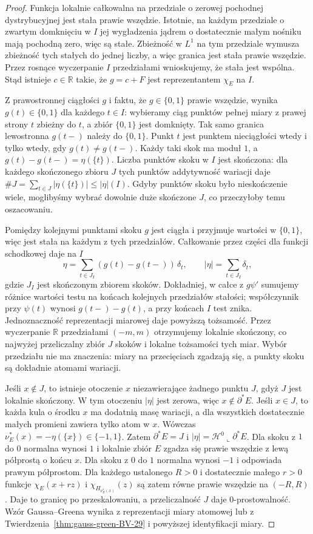 \begin{proof}
Funkcja lokalnie całkowalna na przedziale
o zerowej pochodnej dystrybucyjnej jest stała
prawie wszędzie. Istotnie, na każdym przedziale
o zwartym domknięciu w $I$ jej wygładzenia
jądrem o dostatecznie małym nośniku mają
pochodną zero, więc są stałe. Zbieżność
w $L^1$ na tym przedziale wymusza zbieżność
tych stałych do jednej liczby, a więc granica
jest stała prawie wszędzie. Przez rosnące
wyczerpanie $I$ przedziałami wnioskujemy,
że stała jest wspólna. Stąd istnieje $c\in\mathbb R$
takie, że $g=c+F$ jest reprezentantem $\chi_E$
na $I$.

Z prawostronnej ciągłości $g$ i faktu, że
$g\in\{0,1\}$ prawie wszędzie, wynika
$g(t)\in\{0,1\}$ dla każdego $t\in I$:
wybieramy ciąg punktów pełnej miary z prawej
strony $t$ zbieżny do $t$, a zbiór $\{0,1\}$
jest domknięty. Tak samo granica lewostronna
$g(t-)$ należy do $\{0,1\}$.
Punkt $t$ jest punktem nieciągłości wtedy
i tylko wtedy, gdy $g(t)\ne g(t-)$.
Każdy taki skok ma moduł $1$, a
$g(t)-g(t-)=\eta(\{t\})$.
Liczba punktów skoku w $I$ jest skończona:
dla każdego skończonego zbioru $J$ tych punktów
addytywność wariacji daje
$\#J=\sum_{t\in J}|\eta(\{t\})|\le|\eta|(I)$.
Gdyby punktów skoku było nieskończenie wiele,
moglibyśmy wybrać dowolnie duże skończone $J$,
co przeczyłoby temu oszacowaniu.

Pomiędzy kolejnymi punktami skoku $g$ jest
ciągła i przyjmuje wartości w $\{0,1\}$, więc
jest stała na każdym z tych przedziałów.
Całkowanie przez części dla funkcji schodkowej
daje na $I$
\[
 \eta=\sum_{t\in J_I}(g(t)-g(t-))\,\delta_t,
 \qquad |\eta|=\sum_{t\in J_I}\delta_t,
\]
gdzie $J_I$ jest skończonym zbiorem skoków.
Dokładniej, w całce z $g\psi'$ sumujemy
różnice wartości testu na końcach kolejnych
przedziałów stałości; współczynnik przy
$\psi(t)$ wynosi $g(t-)-g(t)$, a przy końcach
$I$ test znika. Jednoznaczność reprezentacji
miarowej daje powyższą tożsamość.
Przez wyczerpanie $\mathbb R$ przedziałami
$(-m,m)$ otrzymujemy lokalnie skończony,
co najwyżej przeliczalny zbiór $J$ skoków
i lokalne tożsamości tych miar.
Wybór przedziału nie ma znaczenia: miary
na przecięciach zgadzają się, a punkty skoku
są dokładnie atomami wariacji.

Jeśli $x\notin J$, to istnieje otoczenie
$x$ niezawierające żadnego punktu $J$,
gdyż $J$ jest lokalnie skończony.
W tym otoczeniu $|\eta|$ jest zerowa,
więc $x\notin\partial^*E$.
Jeśli $x\in J$, to każda kula o środku $x$
ma dodatnią masę wariacji, a dla wszystkich
dostatecznie małych promieni zawiera tylko
atom w $x$. Wówczas
$\nu_E^*(x)=-\eta(\{x\})\in\{-1,1\}$.
Zatem $\partial^*E=J$ i
$|\eta|=\mathcal H^0\llcorner\partial^*E$.
Dla skoku z $1$ do $0$ normalna wynosi $1$
i lokalnie zbiór $E$ zgadza się prawie wszędzie
z lewą półprostą o końcu $x$.
Dla skoku z $0$ do $1$ normalna wynosi $-1$
i odpowiada prawym półprostom.
Dla każdego ustalonego $R>0$ i dostatecznie
małego $r>0$ funkcje
$\chi_E(x+rz)$ i $\chi_{H_{\nu_E^*(x)}}(z)$
są zatem równe prawie wszędzie na $(-R,R)$.
Daje to granicę po przeskalowaniu, a
przeliczalność $J$ daje $0$-prostowalność.
Wzór Gaussa--Greena wynika z reprezentacji
miary atomowej lub z
Twierdzenia~\ref{thm:gauss-green-BV-29}
i powyższej identyfikacji miary.
\end{proof}

